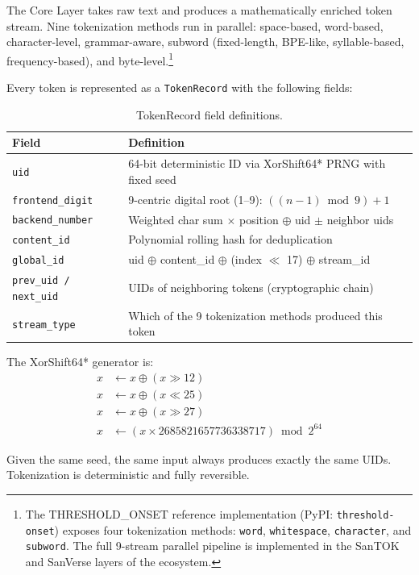 \documentclass[10pt]{article}
\begin{document}
The Core Layer takes raw text and produces a mathematically enriched token stream.
Nine tokenization methods run in parallel: space-based, word-based, character-level,
grammar-aware, subword (fixed-length, BPE-like, syllable-based, frequency-based), and
byte-level.\footnote{The THRESHOLD\_ONSET reference implementation (PyPI: \texttt{threshold-onset})
exposes four tokenization methods: \texttt{word}, \texttt{whitespace}, \texttt{character},
and \texttt{subword}. The full 9-stream parallel pipeline is implemented in the SanTOK
and SanVerse layers of the ecosystem.}

Every token is represented as a \texttt{TokenRecord} with the following fields:

\begin{table}[t]
\centering
\caption{TokenRecord field definitions.}
\label{tab:tokenrecord}
\begin{tabular}{ll}
\toprule
\textbf{Field} & \textbf{Definition} \\
\midrule
\texttt{uid} & 64-bit deterministic ID via XorShift64* PRNG with fixed seed \\
\texttt{frontend\_digit} & 9-centric digital root (1--9): $((n-1) \bmod 9) + 1$ \\
\texttt{backend\_number} & Weighted char sum $\times$ position $\oplus$ uid $\pm$ neighbor uids \\
\texttt{content\_id} & Polynomial rolling hash for deduplication \\
\texttt{global\_id} & uid $\oplus$ content\_id $\oplus$ (index $\ll$ 17) $\oplus$ stream\_id \\
\texttt{prev\_uid / next\_uid} & UIDs of neighboring tokens (cryptographic chain) \\
\texttt{stream\_type} & Which of the 9 tokenization methods produced this token \\
\bottomrule
\end{tabular}
\end{table}

The XorShift64* generator is:
\begin{align}
x &\leftarrow x \oplus (x \gg 12) \nonumber \\
x &\leftarrow x \oplus (x \ll 25) \nonumber \\
x &\leftarrow x \oplus (x \gg 27) \nonumber \\
x &\leftarrow (x \times 2685821657736338717) \bmod 2^{64}
\end{align}

Given the same seed, the same input always produces exactly the same UIDs.
Tokenization is deterministic and fully reversible.
\end{document}
